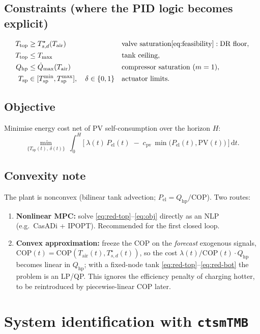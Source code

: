 \documentclass[11pt,a4paper]{article}
\newcommand{\COP}{\mathrm{COP}}
\newcommand{\Qmax}{\dot{Q}_{\max}}
\newcommand{\Ttop}{T_{\mathrm{top}}}
\newcommand{\Tsp}{T_{\mathrm{sp}}} %
\newcommand{\Tair}{T_{\mathrm{air}}}
\newcommand{\Tsdref}{T_{s,d}^{\star}}
\newcommand{\Qhp}{Q_{\mathrm{hp}}}
\newcommand{\Pel}{P_{\mathrm{el}}}
\begin{document}
\subsection{Constraints (where the PID logic becomes explicit)}
\begin{align}
  \Ttop &\ge \Tsdref(\Tair) && \text{valve saturation} \eqref{eq:feasibility}: \text{DR floor},\\
  \Ttop &\le T_{\max} && \text{tank ceiling},\\
  \Qhp &\le \Qmax(\Tair) && \text{compressor saturation } (m=1),\\
  \Tsp &\in [\Tsp^{\min},\Tsp^{\max}], \quad \delta\in\{0,1\} && \text{actuator limits}.
\end{align}

\subsection{Objective}
Minimise energy cost net of PV self-consumption over the horizon $H$:
\begin{equation}
  \min_{\{\Tsp(t),\,\delta(t)\}}\ \int_{0}^{H}
    \Big[\ \lambda(t)\,\Pel(t) \;-\; c_{\text{pv}}\,\min\!\big(\Pel(t),\mathrm{PV}(t)\big)\ \Big]\,\mathrm dt .
  \label{eq:obj}
\end{equation}

\subsection{Convexity note}
The plant is nonconvex (bilinear tank advection; $\Pel=\Qhp/\COP$). Two routes:
\begin{enumerate}[nosep]
  \item \textbf{Nonlinear MPC:} solve \eqref{eq:red-top}--\eqref{eq:obj} directly
        as an NLP (e.g.\ CasADi + IPOPT). Recommended for the first closed loop.
  \item \textbf{Convex approximation:} freeze the COP on the \emph{forecast}
        exogenous signals, $\COP(t)=\COP(\Tair(t),\Tsdref(t))$, so the cost
        $\lambda(t)/\COP(t)\cdot\Qhp$ becomes linear in $\Qhp$; with a fixed-node
        tank \eqref{eq:red-top}--\eqref{eq:red-bot} the problem is an LP/QP. This
        ignores the efficiency penalty of charging hotter, to be reintroduced by
        piecewise-linear COP later.
\end{enumerate}

\section{System identification with \texttt{ctsmTMB}}
\label{sec:sysid}
\end{document}

